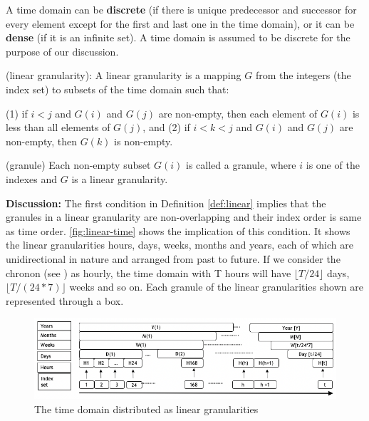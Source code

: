 \documentclass[12pt]{article}
\begin{document}
A time domain can be \textbf{discrete} (if there is unique predecessor and successor for every element except for the first and last one in the time domain), or it can be \textbf{dense} (if it is an infinite set). A time domain is assumed to be discrete for the purpose of our discussion.

\begin{definition}\label{def:linear}
(linear granularity): A linear granularity is a mapping $G$ from the integers (the index set) to subsets of the time domain such that:

  (1) if $i < j$ and $G(i)$ and $G(j)$ are non-empty, then each element of $G(i)$ is less
than all elements of $G(j)$, and  
  (2) if $i < k < j$ and $G(i)$ and $G(j)$ are non-empty, then $G(k)$ is non-empty.  
\end{definition}

\begin{definition}\label{def:granule}
(granule) Each non-empty subset $G(i)$ is called a granule, where $i$ is one of the indexes and $G$ is a linear granularity.
\end{definition}

\textbf{Discussion:} The first condition in Definition \ref{def:linear} implies that the granules in a linear granularity are non-overlapping and their index order is same as time order.
\autoref{fig:linear-time} shows the implication of this condition. It shows the linear granularities hours, days, weeks, months and years, each of which are unidirectional in nature and arranged from past to future. If we consider the chronon (see \citet{aigner2011visualization}) as hourly, the time domain with T hours will have \(\lfloor T/24\rfloor\) days, \(\lfloor T/(24*7)\rfloor\) weeks and so on. Each granule of the linear granularities shown are represented through a box.

\begin{figure}

{\centering \includegraphics[width=1\linewidth]{Figs/linear-arr} 

}

\caption{The time domain distributed as linear granularities}\label{fig:linear-time}
\end{figure}
\end{document}
